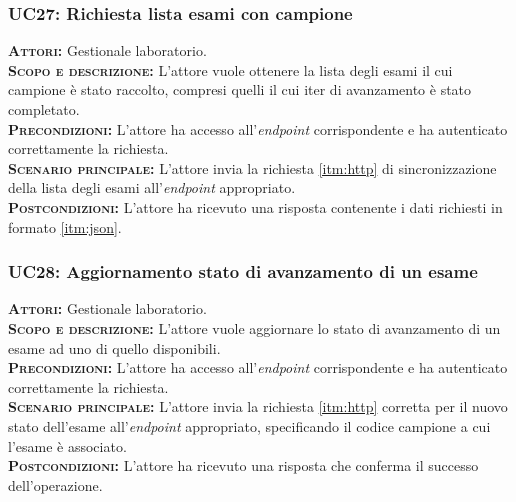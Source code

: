 \subsubsection{UC27: Richiesta lista esami con campione}
\label{sec:UC27}
\textsc{\textbf{Attori:}} Gestionale laboratorio.\\
\textsc{\textbf{Scopo e descrizione:}} L'attore vuole ottenere la lista degli esami il cui campione è stato raccolto, compresi quelli il cui iter di avanzamento è stato completato.\\
\textsc{\textsc{\textbf{Precondizioni:}}} L'attore ha accesso all'\textit{endpoint} corrispondente e ha autenticato correttamente la richiesta.\\
\textsc{\textbf{Scenario principale:}}  L'attore invia la richiesta \ref{itm:http} di sincronizzazione della lista degli esami all'\textit{endpoint} appropriato.\\
\textsc{\textbf{Postcondizioni:}} L'attore ha ricevuto una risposta contenente i dati richiesti in formato \ref{itm:json}.

\subsubsection{UC28: Aggiornamento stato di avanzamento di un esame}
\label{sec:UC28}
\textsc{\textbf{Attori:}} Gestionale laboratorio.\\
\textsc{\textbf{Scopo e descrizione:}} L'attore vuole aggiornare lo stato di avanzamento di un esame ad uno di quello disponibili.\\
\textsc{\textsc{\textbf{Precondizioni:}}} L'attore ha accesso all'\textit{endpoint} corrispondente e ha autenticato correttamente la richiesta.\\
\textsc{\textbf{Scenario principale:}}  L'attore invia la richiesta \ref{itm:http} corretta per il nuovo stato dell'esame all'\textit{endpoint} appropriato, specificando il codice campione a cui l'esame è associato.\\
\textsc{\textbf{Postcondizioni:}} L'attore ha ricevuto una risposta che conferma il successo dell'operazione.

